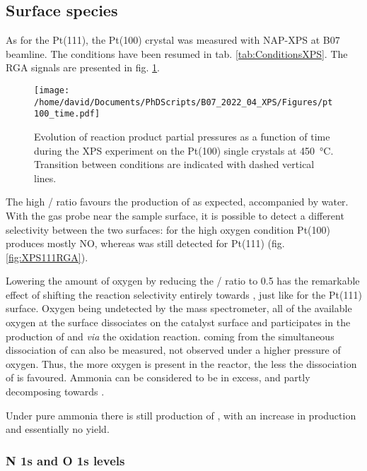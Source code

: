 \subsection{Surface species}

As for the Pt(111), the Pt(100) crystal was measured with NAP-XPS at B07 beamline.
The conditions have been resumed in tab. \ref{tab:ConditionsXPS}.
The RGA signals are presented in fig. \ref{fig:XPS100RGA}.

\begin{figure}[!htb]
    \centering
    \texttt{[image: /home/david/Documents/PhDScripts/B07\_2022\_04\_XPS/Figures/pt100\_time.pdf]}
    \caption{
        Evolution of reaction product partial pressures as a function of time during the XPS experiment on the Pt(100) single crystals at \qty{450}{\degreeCelsius}.
        Transition between conditions are indicated with dashed vertical lines.
    }
    \label{fig:XPS100RGA}
\end{figure}

The high / ratio favours the production of  as expected, accompanied by water.
With the gas probe near the sample surface, it is possible to detect a different selectivity between the two surfaces: for the high oxygen condition Pt(100) produces mostly NO, whereas  was still detected for Pt(111) (fig. \ref{fig:XPS111RGA}).

Lowering the amount of oxygen by reducing the / ratio to \num{0.5} has the remarkable effect of shifting the reaction selectivity entirely towards , just like for the Pt(111) surface.
Oxygen being undetected by the mass spectrometer, all of the available oxygen at the surface dissociates on the catalyst surface and participates in the production of  and  \textit{via} the oxidation reaction.
 coming from the simultaneous dissociation of  can also be measured, not observed under a higher pressure of oxygen.
Thus, the more oxygen is present in the reactor, the less the dissociation of  is favoured.
Ammonia can be considered to be in excess, and partly decomposing towards .

Under pure ammonia there is still production of , with an increase in  production and essentially no  yield.

\subsubsection{N 1s and O 1s levels}

